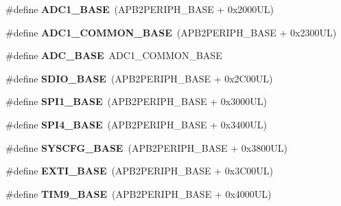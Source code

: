 \begin{DoxyCompactItemize}
\#define {\bfseries A\+D\+C1\+\_\+\+B\+A\+SE}~(A\+P\+B2\+P\+E\+R\+I\+P\+H\+\_\+\+B\+A\+SE + 0x2000\+U\+L)
\item 
\mbox{\label{group___peripheral__memory__map_ga1ef44c8e4398bd3b3fbb0c981657f3d0}} 
\#define {\bfseries A\+D\+C1\+\_\+\+C\+O\+M\+M\+O\+N\+\_\+\+B\+A\+SE}~(A\+P\+B2\+P\+E\+R\+I\+P\+H\+\_\+\+B\+A\+SE + 0x2300\+U\+L)
\item 
\mbox{\label{group___peripheral__memory__map_gad06cb9e5985bd216a376f26f22303cd6}} 
\#define {\bfseries A\+D\+C\+\_\+\+B\+A\+SE}~A\+D\+C1\+\_\+\+C\+O\+M\+M\+O\+N\+\_\+\+B\+A\+SE
\item 
\mbox{\label{group___peripheral__memory__map_ga95dd0abbc6767893b4b02935fa846f52}} 
\#define {\bfseries S\+D\+I\+O\+\_\+\+B\+A\+SE}~(A\+P\+B2\+P\+E\+R\+I\+P\+H\+\_\+\+B\+A\+SE + 0x2\+C00\+U\+L)
\item 
\mbox{\label{group___peripheral__memory__map_ga50cd8b47929f18b05efbd0f41253bf8d}} 
\#define {\bfseries S\+P\+I1\+\_\+\+B\+A\+SE}~(A\+P\+B2\+P\+E\+R\+I\+P\+H\+\_\+\+B\+A\+SE + 0x3000\+U\+L)
\item 
\mbox{\label{group___peripheral__memory__map_gac5cfaedf263cee1e79554665f921c708}} 
\#define {\bfseries S\+P\+I4\+\_\+\+B\+A\+SE}~(A\+P\+B2\+P\+E\+R\+I\+P\+H\+\_\+\+B\+A\+SE + 0x3400\+U\+L)
\item 
\mbox{\label{group___peripheral__memory__map_ga62246020bf3b34b6a4d8d0e84ec79d3d}} 
\#define {\bfseries S\+Y\+S\+C\+F\+G\+\_\+\+B\+A\+SE}~(A\+P\+B2\+P\+E\+R\+I\+P\+H\+\_\+\+B\+A\+SE + 0x3800\+U\+L)
\item 
\mbox{\label{group___peripheral__memory__map_ga87371508b3bcdcd98cd1ec629be29061}} 
\#define {\bfseries E\+X\+T\+I\+\_\+\+B\+A\+SE}~(A\+P\+B2\+P\+E\+R\+I\+P\+H\+\_\+\+B\+A\+SE + 0x3\+C00\+U\+L)
\item 
\mbox{\label{group___peripheral__memory__map_ga92ae902be7902560939223dd765ece08}} 
\#define {\bfseries T\+I\+M9\+\_\+\+B\+A\+SE}~(A\+P\+B2\+P\+E\+R\+I\+P\+H\+\_\+\+B\+A\+SE + 0x4000\+U\+L)

\end{DoxyCompactItemize}
